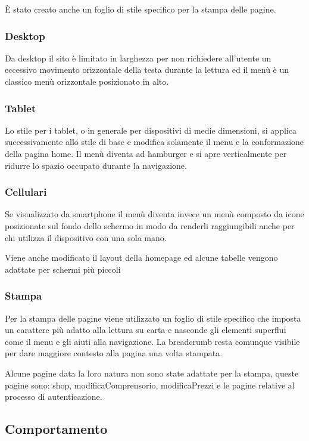È stato creato anche un foglio di stile specifico per la stampa delle pagine.

\subsubsection{Desktop}
Da desktop il sito è limitato in larghezza per non richiedere all'utente un eccessivo movimento orizzontale della testa durante la lettura ed il menù è un classico menù orizzontale posizionato in alto.

\subsubsection{Tablet}
Lo stile per i tablet, o in generale per dispositivi di medie dimensioni, si applica successivamente allo stile di base e modifica solamente il menu e la conformazione della pagina home.
Il menù diventa ad hamburger e si apre verticalmente per ridurre lo spazio occupato durante la navigazione.

\subsubsection{Cellulari}
Se visualizzato da smartphone il menù diventa invece un menù composto da icone posizionate sul fondo dello schermo in modo da renderli raggiungibili anche per chi utilizza il dispositivo con una sola mano.

Viene anche modificato il layout della homepage ed alcune tabelle vengono adattate per schermi più piccoli

\subsubsection{Stampa}
Per la stampa delle pagine viene utilizzato un foglio di stile specifico che imposta un carattere più adatto alla lettura su carta e nasconde gli elementi superflui come il menu e gli aiuti alla navigazione.
La breadcrumb resta comunque visibile per dare maggiore contesto alla pagina una volta stampata.

Alcune pagine data la loro natura non sono state adattate per la stampa, queste pagine sono: shop, modificaComprensorio, modificaPrezzi e le pagine relative al processo di autenticazione.

\subsection{Comportamento}

